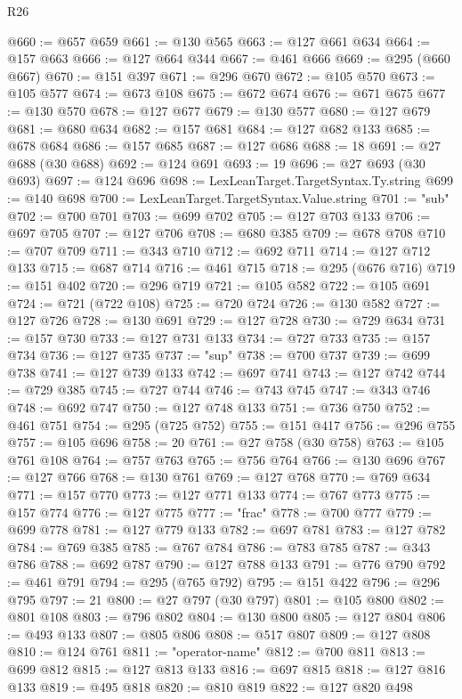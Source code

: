 \begin{lexlean}{R26}
\begin{coremodule}
@660 := @657 @659
@661 := @130 @565
@663 := @127 @661 @634
@664 := @157 @663
@666 := @127 @664 @344
@667 := @461 @666
@669 := @295 (@660 @667)
@670 := @151 @397
@671 := @296 @670
@672 := @105 @570
@673 := @105 @577
@674 := @673 @108
@675 := @672 @674
@676 := @671 @675
@677 := @130 @570
@678 := @127 @677
@679 := @130 @577
@680 := @127 @679
@681 := @680 @634
@682 := @157 @681
@684 := @127 @682 @133
@685 := @678 @684
@686 := @157 @685
@687 := @127 @686
@688 := 18
@691 := @27 @688 (@30 @688)
@692 := @124 @691
@693 := 19
@696 := @27 @693 (@30 @693)
@697 := @124 @696
@698 := LexLeanTarget.TargetSyntax.Ty.string
@699 := @140 @698
@700 := LexLeanTarget.TargetSyntax.Value.string
@701 := "sub"
@702 := @700 @701
@703 := @699 @702
@705 := @127 @703 @133
@706 := @697 @705
@707 := @127 @706
@708 := @680 @385
@709 := @678 @708
@710 := @707 @709
@711 := @343 @710
@712 := @692 @711
@714 := @127 @712 @133
@715 := @687 @714
@716 := @461 @715
@718 := @295 (@676 @716)
@719 := @151 @402
@720 := @296 @719
@721 := @105 @582
@722 := @105 @691
@724 := @721 (@722 @108)
@725 := @720 @724
@726 := @130 @582
@727 := @127 @726
@728 := @130 @691
@729 := @127 @728
@730 := @729 @634
@731 := @157 @730
@733 := @127 @731 @133
@734 := @727 @733
@735 := @157 @734
@736 := @127 @735
@737 := "sup"
@738 := @700 @737
@739 := @699 @738
@741 := @127 @739 @133
@742 := @697 @741
@743 := @127 @742
@744 := @729 @385
@745 := @727 @744
@746 := @743 @745
@747 := @343 @746
@748 := @692 @747
@750 := @127 @748 @133
@751 := @736 @750
@752 := @461 @751
@754 := @295 (@725 @752)
@755 := @151 @417
@756 := @296 @755
@757 := @105 @696
@758 := 20
@761 := @27 @758 (@30 @758)
@763 := @105 @761 @108
@764 := @757 @763
@765 := @756 @764
@766 := @130 @696
@767 := @127 @766
@768 := @130 @761
@769 := @127 @768
@770 := @769 @634
@771 := @157 @770
@773 := @127 @771 @133
@774 := @767 @773
@775 := @157 @774
@776 := @127 @775
@777 := "frac"
@778 := @700 @777
@779 := @699 @778
@781 := @127 @779 @133
@782 := @697 @781
@783 := @127 @782
@784 := @769 @385
@785 := @767 @784
@786 := @783 @785
@787 := @343 @786
@788 := @692 @787
@790 := @127 @788 @133
@791 := @776 @790
@792 := @461 @791
@794 := @295 (@765 @792)
@795 := @151 @422
@796 := @296 @795
@797 := 21
@800 := @27 @797 (@30 @797)
@801 := @105 @800
@802 := @801 @108
@803 := @796 @802
@804 := @130 @800
@805 := @127 @804
@806 := @493 @133
@807 := @805 @806
@808 := @517 @807
@809 := @127 @808
@810 := @124 @761
@811 := "operator-name"
@812 := @700 @811
@813 := @699 @812
@815 := @127 @813 @133
@816 := @697 @815
@818 := @127 @816 @133
@819 := @495 @818
@820 := @810 @819
@822 := @127 @820 @498

\end{coremodule}
\end{lexlean}

